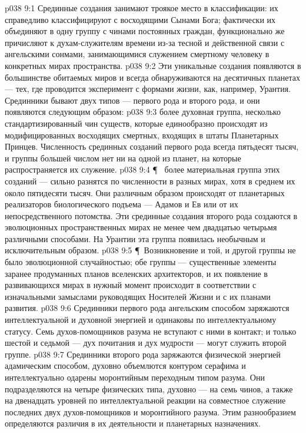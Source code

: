 \vs p038 9:1 Срединные создания занимают троякое место в классификации: их справедливо классифицируют с восходящими Сынами Бога; фактически их объединяют в одну группу с чинами постоянных граждан, функционально же причисляют к духам\hyp{}служителям времени из\hyp{}за тесной и действенной связи с ангельскими сонмами, занимающимися служением смертному человеку в конкретных мирах пространства.
\vs p038 9:2 Эти уникальные создания появляются в большинстве обитаемых миров и всегда обнаруживаются на десятичных планетах --- тех, где проводится эксперимент с формами жизни, как, например, Урантия. Срединники бывают двух типов --- первого рода и второго рода, и они появляются следующим образом:
\vs p038 9:3 \bibnobreakspace {} более духовная группа, несколько стандартизированный чин существ, которые единообразно происходят из модифицированных восходящих смертных, входящих в штаты Планетарных Принцев. Численность срединных созданий первого рода всегда пятьдесят тысяч, и группы большей числом нет ни на одной из планет, на которые распространяется их служение.
\vs p038 9:4 \P\ \bibnobreakspace {} более материальная группа этих созданий --- сильно разнятся по численности в разных мирах, хотя в среднем их около пятидесяти тысяч. Они различным образом происходят от планетарных реализаторов биологического подъема --- Адамов и Ев или от их непосредственного потомства. Эти срединные создания второго рода создаются в эволюционных пространственных мирах не менее чем двадцатью четырьмя различными способами. На Урантии эта группа появилась необычным и исключительным образом.
\vs p038 9:5 \P\ Возникновение и той, и другой группы не было эволюционной случайностью; обе группы --- существенные элементы заранее продуманных планов вселенских архитекторов, и их появление в развивающихся мирах в нужный момент происходит в соответствии с изначальными замыслами руководящих Носителей Жизни и с их планами развития.
\vs p038 9:6 Срединники первого рода ангельским способом заряжаются интеллектуальной и духовной энергией и одинаковы по интеллектуальному статусу. Семь духов\hyp{}помощников разума не вступают с ними в контакт; и только шестой и седьмой --- дух почитания и дух мудрости --- могут служить второй группе.
\vs p038 9:7 Срединники второго рода заряжаются физической энергией адамическим способом, духовно объемлются контуром серафима и интеллектуально одарены моронтийным переходным типом разума. Они подразделяются на четыре физических типа, духовно --- на семь чинов, а также на двенадцать уровней по интеллектуальной реакции на совместное служение последних двух духов\hyp{}помощников и моронтийного разума. Этим разнообразием определяются различия в их деятельности и планетарных назначениях.
